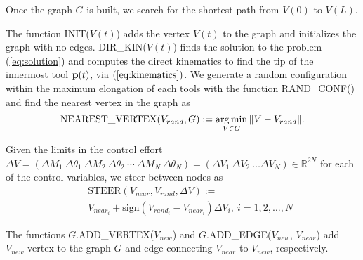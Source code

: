 Once the graph $G$ is built, we search for the shortest path from $V(0)$ to $V(L)$.

The function INIT($V(t)$) adds the vertex $V(t)$ to the graph and initializes the graph with no edges. DIR\_KIN($V(t)$) finds the solution to the problem (\ref{eq:solution}) and computes the direct kinematics to find the tip of the innermost tool $\mathbf{p}(t)$, via $(\ref{eq:kinematics})$. We generate a random configuration within the maximum elongation of each tools with the function RAND\_CONF() and find the nearest vertex in the graph as
\begin{equation}
    \text{NEAREST\_VERTEX}(V_{rand}, G) := \operatorname*{arg\,min}_{V \in G} \|V - V_{rand} \|.
\end{equation}

Given the limits in the control effort $\Delta V = \left(\Delta M_1 \ \Delta \theta_1 \ \Delta M_2 \ \Delta \theta_2 \ \cdots \ \Delta M_N \ \Delta \theta_N \right) =\left(\Delta V_1 \ \Delta V_2 \ \dots \Delta V_{N} \right)  \in \mathbb{R}^{2 N}$ for each of the control variables, we steer between nodes as
\begin{eqnarray}
    && \text{STEER}(V_{near}, V_{rand}, \Delta V) := \\
    && V_{{near}_i} + \text{sign}(V_{{rand}_i} - V_{{near}_i})\Delta V_{i}, \ i = 1, 2, \dots, N \nonumber
\end{eqnarray}

The functions $G.$ADD\_VERTEX($V_{new}$) and $G.$ADD\_EDGE($V_{new}$, $V_{near}$) add $V_{new}$ vertex to the graph $G$ and edge connecting $V_{near}$ to $V_{new}$, respectively.